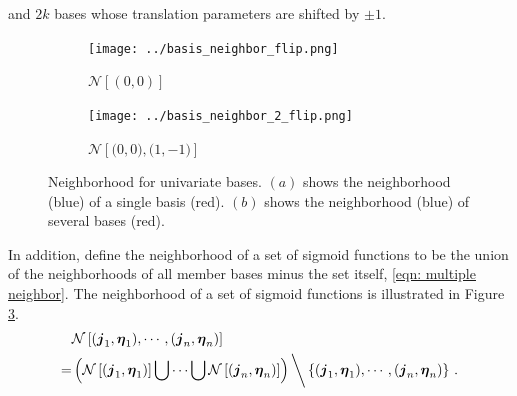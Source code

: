 and $2k$ bases whose translation parameters are shifted by $\pm 1$.
\begin{figure}[Htbp]\begin{center}
    \begin{subfigure}[p]{1.\textwidth}
        \centering
        \texttt{[image: ../basis\_neighbor\_flip.png]}
        \caption{$\mathcal{N}\left[\left(0,0\right)\right]$}
        \label{fig: basis neighbor}
    \end{subfigure}
    \begin{subfigure}[p]{1.\textwidth}
        \centering
        \texttt{[image: ../basis\_neighbor\_2\_flip.png]}
        \caption{$\mathcal{N}\left[ \big(0, 0\big), \big(1, -1\big)
                 \right]$}
        \label{fig: union neighbor}
    \end{subfigure}
    \caption{Neighborhood for univariate bases. 
             $(a)$ shows the neighborhood (blue)
             of a single basis (red).  $(b)$ shows the neighborhood (blue) 
             of several bases (red).}
\end{center}\end{figure}
In addition, define the neighborhood of a set of sigmoid functions to be the union
of the neighborhoods of all member bases minus the set itself, 
\eqref{eqn: multiple neighbor}. The neighborhood of 
a set of sigmoid functions
is illustrated in Figure \ref{fig: union neighbor}.
\begin{equation}\begin{split}
    &\mathcal{N}\left[(\boldsymbol{j}_1, \boldsymbol{\eta}_1), \cdots, 
    ( \boldsymbol{j}_n, \boldsymbol{\eta}_n) \right]\\
    = &\left( \mathcal{N}\left[(\boldsymbol{j}_1, \boldsymbol{\eta}_1)\right]\bigcup \cdots 
      \bigcup \mathcal{N}\left[(\boldsymbol{j}_n, \boldsymbol{\eta}_n)\right]\right)
      \bigg\backslash \left\{(\boldsymbol{j}_1, \boldsymbol{\eta}_1), \cdots, 
      ( \boldsymbol{j}_n, \boldsymbol{\eta}_n) \right\}\,.
\label{eqn: multiple neighbor}
\end{split}\end{equation}\\

